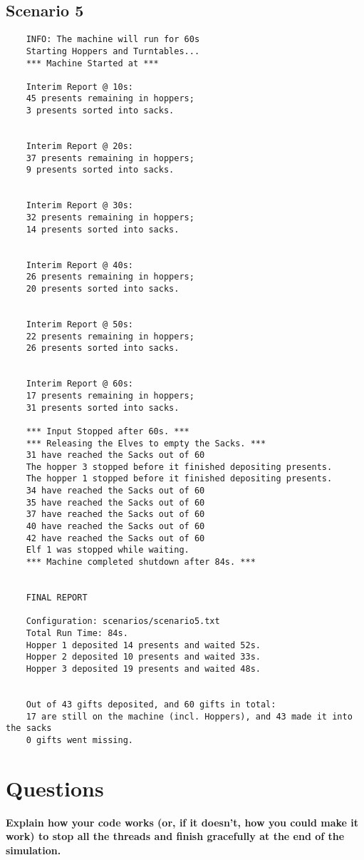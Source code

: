 \documentclass[a4paper,12pt]{article}
\begin{document}
    \subsection{Scenario 5}
    \begin{verbatim}
    INFO: The machine will run for 60s
    Starting Hoppers and Turntables...
    *** Machine Started at ***

    Interim Report @ 10s:
    45 presents remaining in hoppers;
    3 presents sorted into sacks.


    Interim Report @ 20s:
    37 presents remaining in hoppers;
    9 presents sorted into sacks.


    Interim Report @ 30s:
    32 presents remaining in hoppers;
    14 presents sorted into sacks.


    Interim Report @ 40s:
    26 presents remaining in hoppers;
    20 presents sorted into sacks.


    Interim Report @ 50s:
    22 presents remaining in hoppers;
    26 presents sorted into sacks.


    Interim Report @ 60s:
    17 presents remaining in hoppers;
    31 presents sorted into sacks.

    *** Input Stopped after 60s. ***
    *** Releasing the Elves to empty the Sacks. ***
    31 have reached the Sacks out of 60
    The hopper 3 stopped before it finished depositing presents.
    The hopper 1 stopped before it finished depositing presents.
    34 have reached the Sacks out of 60
    35 have reached the Sacks out of 60
    37 have reached the Sacks out of 60
    40 have reached the Sacks out of 60
    42 have reached the Sacks out of 60
    Elf 1 was stopped while waiting.
    *** Machine completed shutdown after 84s. ***


    FINAL REPORT

    Configuration: scenarios/scenario5.txt
    Total Run Time: 84s.
    Hopper 1 deposited 14 presents and waited 52s.
    Hopper 2 deposited 10 presents and waited 33s.
    Hopper 3 deposited 19 presents and waited 48s.


    Out of 43 gifts deposited, and 60 gifts in total:
    17 are still on the machine (incl. Hoppers), and 43 made it into the sacks
    0 gifts went missing.
    \end{verbatim}

    \section{Questions}
    \textbf{Explain how your code works (or, if it doesn’t, how you could make it work)
    to stop all the threads and finish gracefully at the end of the simulation.\\}
    
\end{document}
